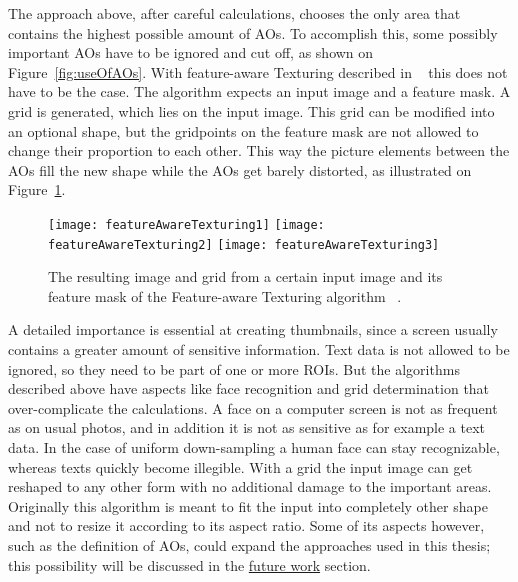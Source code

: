 \documentclass[draft,final]{vutinfth} %
\begin{document}
	The approach above, after careful calculations, chooses the only area that contains the highest possible amount of AOs.
	To accomplish this, some possibly important AOs have to be ignored and cut off, as shown on Figure~\ref{fig:useOfAOs}.
	With feature-aware Texturing described in ~\cite{gal2006feature} this does not have to be the case.
	The algorithm expects an input image and a feature mask.
	A grid is generated, which lies on the input image.
	This grid can be modified into an optional shape, but the gridpoints on the feature mask are not allowed to change their proportion to each other.
	This way the picture elements between the AOs fill the new shape while the AOs get barely distorted, as illustrated on Figure~\ref{fig:fat}.\par 
	 \begin{figure}[h]
		\texttt{[image: featureAwareTexturing1]}\hfill
		\texttt{[image: featureAwareTexturing2]}\hfill
		\texttt{[image: featureAwareTexturing3]}
		\caption{The resulting image and grid from a certain input image and its feature mask of the Feature-aware Texturing algorithm ~\cite{gal2006feature}. }
		\label{fig:fat}
	\end{figure}
	A detailed importance is essential at creating thumbnails, since a screen usually contains a greater amount of sensitive information.
	Text data is not allowed to be ignored, so they need to be part of one or more ROIs.
	But the algorithms described above have aspects like face recognition and grid determination that over-complicate the calculations.
	A face on a computer screen is not as frequent as on usual photos, and in addition it is not as sensitive as for example a text data.
	In the case of uniform down-sampling a human face can stay recognizable, whereas texts quickly become illegible. 
	With a grid the input image can get reshaped to any other form with no additional damage to the important areas.
	Originally this algorithm is meant to fit the input into completely other shape and not to resize it according to its aspect ratio.
	Some of its aspects however, such as the definition of AOs, could expand the approaches used in this thesis; this possibility will be discussed in the \hyperref[futureWork]{future work} section.
	
\end{document}
